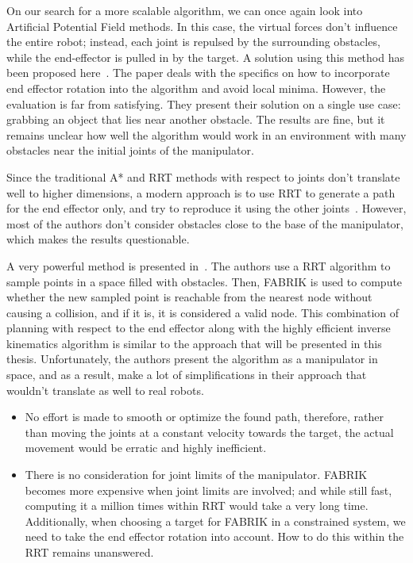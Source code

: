 On our search for a more scalable algorithm, we can once again look into Artificial Potential Field methods. In this case, the virtual forces don't influence the entire robot; instead, each joint is repulsed by the surrounding obstacles, while the end-effector is pulled in by the target. A solution using this method has been proposed here~\cite{aapf}. The paper deals with the specifics on how to incorporate end effector rotation into the algorithm and avoid local minima. However, the evaluation is far from satisfying. They present their solution on a single use case: grabbing an object that lies near another obstacle. The results are fine, but it remains unclear how well the algorithm would work in an environment with many obstacles near the initial joints of the manipulator.

Since the traditional A* and RRT methods with respect to joints don't translate well to higher dimensions, a modern approach is to use RRT to generate a path for the end effector only, and try to reproduce it using the other joints~\cite{RRT_manipulator, rrt_industrial}. However, most of the authors don't consider obstacles close to the base of the manipulator, which makes the results questionable.

A very powerful method is presented in~\cite{rrt_fabrik}. The authors use a RRT algorithm to sample points in a space filled with obstacles. Then, FABRIK is used to compute whether the new sampled point is reachable from the nearest node without causing a collision, and if it is, it is considered a valid node. This combination of planning with respect to the end effector along with the highly efficient inverse kinematics algorithm is similar to the approach that will be presented in this thesis. Unfortunately, the authors present the algorithm as a manipulator in space, and as a result, make a lot of simplifications in their approach that wouldn't translate as well to real robots.

\begin{itemize}
  \item No effort is made to smooth or optimize the found path, therefore, rather than moving the joints at a constant velocity towards the target, the actual movement would be erratic and highly inefficient.

  \item There is no consideration for joint limits of the manipulator. FABRIK becomes more expensive when joint limits are involved; and while still fast, computing it a million times within RRT would take a very long time. Additionally, when choosing a target for FABRIK in a constrained system, we need to take the end effector rotation into account. How to do this within the RRT remains unanswered.
\end{itemize}
